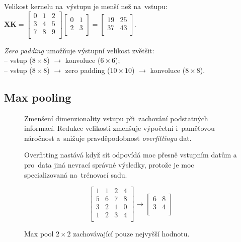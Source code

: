 Velikost kernelu na~výstupu je menší než na~vstupu:
$\mathbf{X} \mathbf{K} = \left[ \begin{matrix}
0 & 1 & 2 \\
3 & 4 & 5 \\
7 & 8 & 9 \\
\end{matrix} \right] \left[ \begin{matrix}
0 & 1 \\
2 & 3 \\
\end{matrix} \right] = \left[ \begin{matrix}
19 & 25 \\
37 & 43 \\
\end{matrix} \right]$.

\emph{Zero padding} umožňuje výstupní velikost zvětšit:
\\-- vstup ($8 \times 8$) $\rightarrow$ konvoluce ($6 \times 6$);
\\-- vstup ($8 \times 8$) $\rightarrow$ zero padding ($10 \times 10$) $\rightarrow$ konvoluce ($8 \times 8$).

\subsection{Max pooling}

\begin{figure}[ht]
\onehalfspacing
\begin{minipage}[c]{0.68\textwidth}
    Zmenšení dimenzionality vstupu při~zachování podstatných informací.
    Redukce velikosti zmenšuje výpočetní i~paměťovou náročnost a~snižuje pravděpodobnost \emph{overfittingu} dat.

    \vspace*{1em}
    Overfitting nastává když síť odpovídá moc přesně vstupním datům a pro~data jiná nevrací správné výsledky, protože je moc specializovaná na~trénovací sadu.
\end{minipage}
\begin{minipage}[c]{0.30\textwidth}
    $$
    \left[\begin{matrix}
    1 & 1 & 2 & 4 \\
    5 & 6 & 7 & 8 \\
    3 & 2 & 1 & 0 \\
    1 & 2 & 3 & 4 \\
    \end{matrix} \right] \rightarrow \left[\begin{matrix}
    6 & 8 \\
    3 & 4 \\
    \end{matrix} \right]
    $$
    \caption{Max pool $2 \times 2$ zachovávající pouze nejvyšší hodnotu.}
\end{minipage}
\end{figure}
\FloatBarrier

